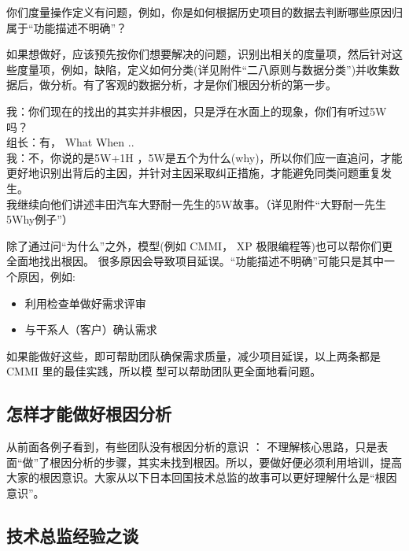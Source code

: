 你们度量操作定义有问题，例如，你是如何根据历史项目的数据去判断哪些原因归属于``功能描述不明确''？

如果想做好，应该预先按你们想要解决的问题，识别出相关的度量项，然后针对这些度量项，例如，缺陷，定义如何分类(详见附件``二八原则与数据分类'')并收集数据后，做分析。有了客观的数据分析，才是你们根因分析的第一步。

\begin{description}
\item[]
\begin{description}
\tightlist
\item[]
= = =
\end{description}
\end{description}

我：你们现在的找出的其实并非根因，只是浮在水面上的现象，你们有听过5W吗？\\
组长：有， What When ..\\
我：不，你说的是5W+1H
，5W是五个为什么(why)，所以你们应一直追问，才能更好地识别出背后的主因，并针对主因采取纠正措施，才能避免同类问题重复发生。\\
我继续向他们讲述丰田汽车大野耐一先生的5W故事。（详见附件``大野耐一先生5Why例子''）

除了通过问``为什么''之外，模型(例如 CMMI， XP
极限编程等)也可以帮你们更全面地找出根因。
很多原因会导致项目延误。``功能描述不明确''可能只是其中一个原因，例如:

\begin{itemize}
\tightlist
\item
  利用检查单做好需求评审
\item
  与干系人（客户）确认需求
\end{itemize}

如果能做好这些，即可帮助团队确保需求质量，减少项目延误，以上两条都是
CMMI 里的最佳实践，所以模 型可以帮助团队更全面地看问题。

\hypertarget{ux9999ux6e2fux5357ux4e2bux6d77ux96be}{%
\subsection{怎样才能做好根因分析}\label{ux9999ux6e2fux5357ux4e2bux6d77ux96be}}

从前面各例子看到，有些团队没有根因分析的意识 ：
不理解核心思路，只是表面``做''了根因分析的步骤，其实未找到根因。所以，要做好便必须利用培训，提高大家的根因意识。大家从以下日本回国技术总监的故事可以更好理解什么是``根因意识''。

\hypertarget{ux6280ux672fux603bux76d1ux7ecfux9a8cux4e4bux8c08}{%
\subsection{技术总监经验之谈}\label{ux6280ux672fux603bux76d1ux7ecfux9a8cux4e4bux8c08}}

